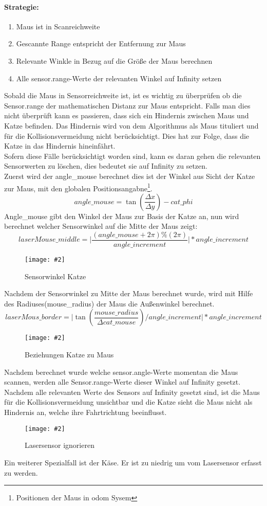 \documentclass[
a4paper,     %
12pt         %
]{scrartcl}  %
\newcommand{\mygraphics}[3]{
\begin{figure}[!h]
  \begin{center}
    \texttt{[image: \#2]} \\
    \caption{#3}\label{fig:#2}
  \end{center}
\end{figure}

}
\begin{document}
\paragraph{Strategie:}
\begin{enumerate}
\item Maus ist in Scanreichweite
\item Gescannte Range entspricht der Entfernung zur Maus
\item Relevante Winkle in Bezug auf die Größe der Maus berechnen
\item Alle sensor.range-Werte der relevanten Winkel auf Infinity setzen
\end{enumerate}
Sobald die Maus in Sensorreichweite ist, ist es wichtig zu überprüfen ob die Sensor.range der mathematischen Distanz zur Maus entspricht. Falls man dies nicht überprüft kann es passieren, dass sich ein Hindernis zwischen Maus und Katze befinden. Das Hindernis wird von dem Algorithmus als Maus tituliert und für die Kollisionsvermeidung nicht berücksichtigt. Dies hat zur Folge, dass die Katze in das Hindernis hineinfährt.\\
Sofern diese Fälle berücksichtigt worden sind, kann es daran gehen die relevanten Sensorwerten zu löschen, dies bedeutet sie auf Infinity zu setzen. \\
Zuerst wird der angle\_mouse berechnet dies ist der Winkel aus Sicht der Katze zur Maus, mit den globalen Positionsangabne\footnote{Positionen der Maus in odom Sysem}.
\[ angle\_mouse=\tan( \frac{\Delta x}{\Delta y} ) -cat\_phi \]
Angle\_mouse gibt den Winkel der Maus zur Basis der Katze an, nun wird berechnet welcher Sensorwinkel auf die Mitte der Maus zeigt:
\[ laserMouse\_middle  =  \vert \frac{ (angle\_mouse + 2  \pi) \% (2 \pi)}{angle\_increment}  \vert * angle\_increment \]
\mygraphics{0.5\textwidth}{collisionANGLE2.png}{Sensorwinkel Katze}
Nachdem der Sensorwinkel zu Mitte der Maus berechnet wurde, wird mit Hilfe des Radiuses(mouse\_radius) der Maus die Außenwinkel berechnet.
\[
laserMous\_border =  \vert { \tan( \frac{mouse\_radius}{\Delta cat\_mouse} ) } / angle\_increment \vert  * angle\_increment \]
\hspace*{0.63\textwidth}
\mygraphics{0.5\textwidth}{catmous.png}{Beziehungen Katze zu Maus}
Nachdem berechnet wurde welche sensor.angle-Werte momentan die Maus scannen, werden alle Sensor.range-Werte dieser Winkel auf Infinity gesetzt. Nachdem alle relevanten Werte des     Sensors auf Infinity gesetzt sind, ist die Maus für die Kollisionsvermeidung unsichtbar und die Katze sieht die Maus nicht als Hindernis an, welche ihre Fahrtrichtung beeinflusst.\\
\mygraphics{0.5\textwidth}{collisionMOUS.png}{Lasersensor ignorieren }
Ein weiterer Spezialfall ist der Käse. Er ist zu niedrig um vom Lasersensor erfasst zu werden.
\end{document}
